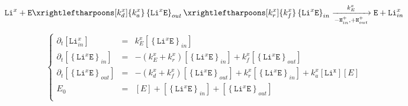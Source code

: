 \documentclass[aps,onecolumn]{revtex4}
\newcommand{\mychem}[1]{\mathtt{#1}}
\newcommand{\myconc}[1]{\left\lbrack{#1}\right\rbrack}
\begin{document}
\begin{equation}
	 \mychem{Li}^{x} +  \mychem{E}  
	 \xrightleftharpoons[k_d^x]{k_a^x} 
	 \left\lbrace\mychem{Li}^{x}\mychem{E}\right\rbrace_{out} 
	  \xrightleftharpoons[k_r^x]{k_f^x} 
	  \left\lbrace\mychem{Li}^{x}\mychem{E}\right\rbrace_{in}  
	   \xrightarrow[-\mychem{H}^+_{in},+\mychem{H}^+_{out}]{k_E^x} \mychem{E}  + \mychem{Li}_{in}^{x}
\end{equation}

\begin{equation}
\left\lbrace
\begin{array}{rcl}
	\partial_t \myconc{\mychem{Li}_{in}^x} & = & k_E^x \myconc{\left\lbrace\mychem{Li}^{x}\mychem{E}\right\rbrace_{in} } \\
	\partial_t \myconc{\left\lbrace\mychem{Li}^{x}\mychem{E}\right\rbrace_{in} } & = & 
	-\left(k_E^x+k_r^x\right) \myconc{\left\lbrace\mychem{Li}^{x}\mychem{E}\right\rbrace_{in} }
	+k_f^x \myconc{\left\lbrace\mychem{Li}^{x}\mychem{E}\right\rbrace_{out} }
	\\
	\partial_t \myconc{\left\lbrace\mychem{Li}^{x}\mychem{E}\right\rbrace_{out} } & = &
	-\left(k_d^x+k_f^x\right) \myconc{\left\lbrace\mychem{Li}^{x}\mychem{E}\right\rbrace_{out} } 
	+k_r^x \myconc{\left\lbrace\mychem{Li}^{x}\mychem{E}\right\rbrace_{in} }
	+k_a^x \myconc{\mychem{Li^x}} \myconc{E}
	\\
	E_0 & = & \myconc{E} + \myconc{\left\lbrace\mychem{Li}^{x}\mychem{E}\right\rbrace_{in} } 
	+ \myconc{\left\lbrace\mychem{Li}^{x}\mychem{E}\right\rbrace_{out} }\\
\end{array}
\right.
\end{equation}
\end{document}
